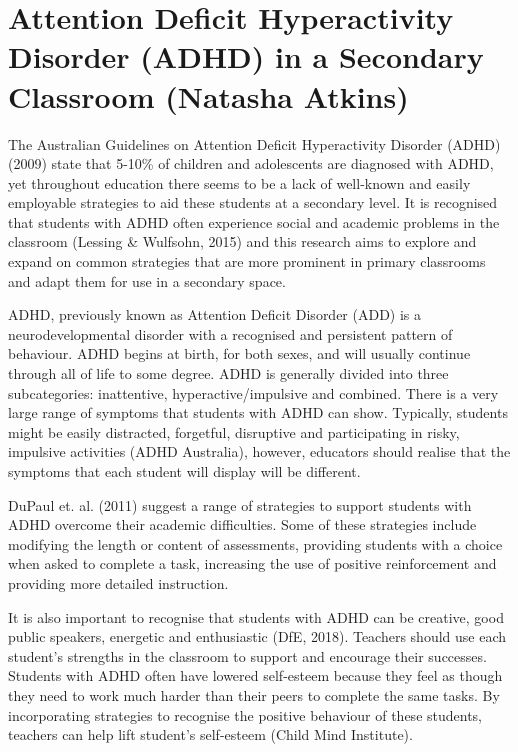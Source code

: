 \documentclass[twoside,14pt,a4paper,notitlepage]{memoir}
\begin{document}
\section*{Attention Deficit Hyperactivity Disorder (ADHD) in a Secondary Classroom (Natasha Atkins)}
\label{aut:atkins}

The Australian Guidelines on Attention Deficit Hyperactivity Disorder (ADHD) (2009) state that 5-10\% of children and adolescents are diagnosed with ADHD, yet throughout education there seems to be a lack of well-known and easily employable strategies to aid these students at a secondary level. It is recognised that students with ADHD often experience social and academic problems in the classroom (Lessing \& Wulfsohn, 2015) and this research aims to explore and expand on common strategies that are more prominent in primary classrooms and adapt them for use in a secondary space.

ADHD, previously known as Attention Deficit Disorder (ADD) is a neurodevelopmental disorder with a recognised and persistent pattern of behaviour. ADHD begins at birth, for both sexes, and will usually continue through all of life to some degree. ADHD is generally divided into three subcategories: inattentive, hyperactive/impulsive and combined. There is a very large range of symptoms that students with ADHD can show. Typically, students might be easily distracted, forgetful, disruptive and participating in risky, impulsive activities (ADHD Australia), however, educators should realise that the symptoms that each student will display will be different.

DuPaul et. al. (2011) suggest a range of strategies to support students with ADHD overcome their academic difficulties. Some of these strategies include modifying the length or content of assessments, providing students with a choice when asked to complete a task, increasing the use of positive reinforcement and providing more detailed instruction.

It is also important to recognise that students with ADHD can be creative, good public speakers, energetic and enthusiastic (DfE, 2018). Teachers should use each student’s strengths in the classroom to support and encourage their successes. Students with ADHD often have lowered self-esteem because they feel as though they need to work much harder than their peers to complete the same tasks. By incorporating strategies to recognise the positive behaviour of these students, teachers can help lift student’s self-esteem (Child Mind Institute).
\end{document}
